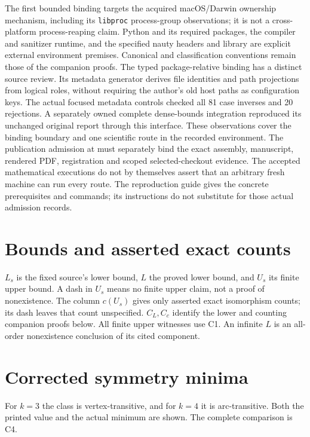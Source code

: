 \documentclass[11pt,a4paper]{article}
\begin{document}
The first bounded binding targets the acquired macOS/Darwin ownership
mechanism, including its \texttt{libproc} process-group observations;
it is not a cross-platform process-reaping claim. Python and its required
packages, the compiler and sanitizer runtime, and the specified nauty
headers and library are explicit external environment premises. Canonical
and classification conventions remain those of the companion proofs.
The typed package-relative binding has a distinct source review. Its
metadata generator derives file identities and path projections from logical
roles, without requiring the author's old host paths as configuration keys.
The actual focused metadata controls checked all 81 case inverses and 20
rejections. A separately owned complete dense-bounds integration reproduced
its unchanged original report through this interface. These observations
cover the binding boundary and one scientific route in the recorded
environment. The publication admission at
 must separately bind
the exact assembly, manuscript, rendered PDF, registration and scoped
selected-checkout evidence. The accepted mathematical executions do not
by themselves assert that an arbitrary fresh machine can run every route.
The reproduction guide gives the concrete prerequisites and commands;
its instructions do not substitute for those actual admission records.

\appendix
\section{Bounds and asserted exact counts}\label{app:bounds}
$L_s$ is the fixed source's lower bound, $L$ the proved lower bound, and
$U_s$ its finite upper bound. A dash in $U_s$ means no finite upper
claim, not a proof of nonexistence. The column $c(U_s)$ gives only
asserted exact isomorphism counts; its dash leaves that count unspecified.
$C_L,C_c$ identify the lower and counting companion proofs below. All
finite upper witnesses use C1. An infinite $L$ is an all-order
nonexistence conclusion of its cited component.
{\small}

\section{Corrected symmetry minima}\label{app:symmetry}
For $k=3$ the class is vertex-transitive, and for $k=4$ it is
arc-transitive. Both the printed value and the actual minimum are shown.
The complete comparison is C4.
{\small}
\end{document}
